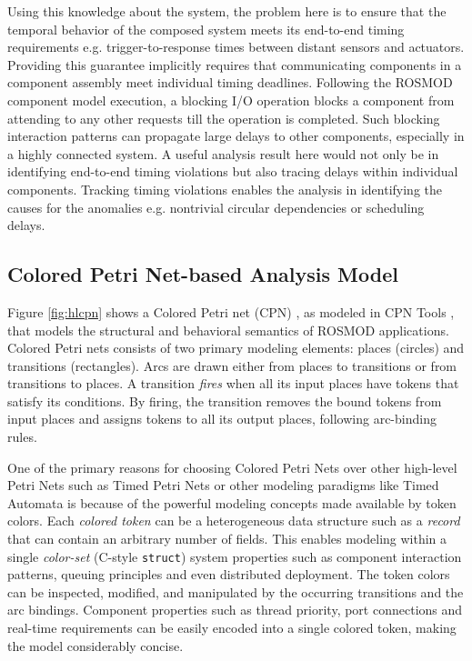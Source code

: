 Using this knowledge about the system, the problem here is to ensure
that the temporal behavior of the composed system meets its end-to-end
timing requirements e.g. trigger-to-response times between distant
sensors and actuators. Providing this guarantee implicitly requires
that communicating components in a component assembly meet individual
timing deadlines. Following the ROSMOD component model execution, a
blocking I/O operation blocks a component from attending to any other
requests till the operation is completed. Such blocking interaction
patterns can propagate large delays to other components, especially in
a highly connected system. A useful analysis result here would not
only be in identifying end-to-end timing violations but also tracing
delays within individual components. Tracking timing violations
enables the analysis in identifying the causes for the anomalies
e.g. nontrivial circular dependencies or scheduling delays.

\subsection{Colored Petri Net-based Analysis Model}

Figure \ref{fig:hlcpn} shows a Colored Petri net (CPN) \cite{CPN}, as
modeled in CPN Tools \cite{CPNTools}, that models the structural and
behavioral semantics of ROSMOD applications. Colored Petri nets
consists of two primary modeling elements: places (circles) and
transitions (rectangles). Arcs are drawn either from places to
transitions or from transitions to places. A transition \emph{fires}
when all its input places have tokens that satisfy its conditions. By
firing, the transition removes the bound tokens from input places and
assigns tokens to all its output places, following arc-binding rules.

One of the primary reasons for choosing Colored Petri Nets over other
high-level Petri Nets such as Timed Petri Nets or other modeling
paradigms like Timed Automata is because of the powerful modeling
concepts made available by token colors. Each \emph{colored token} can
be a heterogeneous data structure such as a \emph{record} that can
contain an arbitrary number of fields. This enables modeling within a
single \emph{color-set} (C-style \texttt{struct}) system properties
such as component interaction patterns, queuing principles and even
distributed deployment. The token colors can be inspected, modified,
and manipulated by the occurring transitions and the arc
bindings. Component properties such as thread priority, port
connections and real-time requirements can be easily encoded into a
single colored token, making the model considerably concise.

